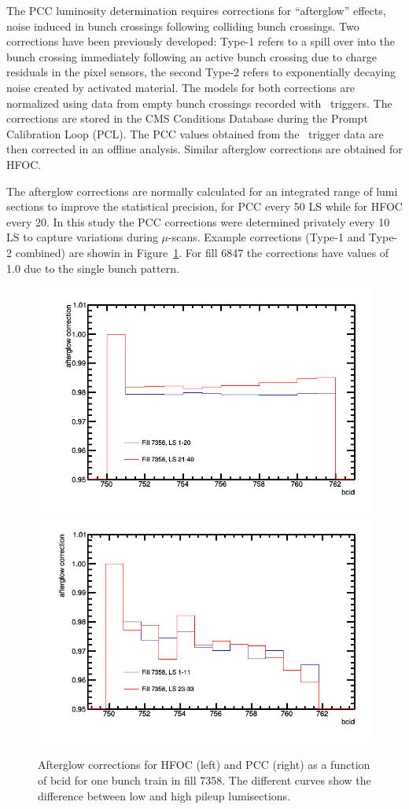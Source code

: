 
The PCC luminosity determination requires corrections for ``afterglow'' effects, noise induced in bunch crossings following colliding bunch crossings.
Two corrections have been previously developed: Type-1 refers to a spill over into the bunch crossing immediately following an active bunch crossing due to charge residuals in the pixel sensors, the second Type-2 refers to exponentially decaying noise created by activated material.
The models for both corrections are normalized using data from empty bunch crossings recorded with \random\ triggers.
The corrections are stored in the CMS Conditions Database during the Prompt Calibration Loop (PCL).
The PCC values obtained from the \zerobias\ trigger data are then corrected in an offline analysis.
Similar afterglow corrections are obtained for HFOC.

The afterglow corrections are normally calculated for an integrated range of lumi sections to improve the statistical precision, for PCC every 50 LS while for HFOC every 20. In this study the PCC corrections were determined privately every 10 LS to capture variations during $\mu$-scans.
Example corrections (Type-1 and Type-2 combined) are showin in Figure~\ref{fig:afterglow}.
For fill 6847 the corrections have values of 1.0 due to the single bunch pattern.

\begin{figure}[t]
  \begin{center}
    \includegraphics[width=0.47\linewidth]{plots/HFAfterglowCorr.png}
    \includegraphics[width=0.47\linewidth]{plots/PCCAfterglowCorr.png}
    \caption{
      Afterglow corrections for HFOC (left) and PCC (right) as a function of bcid for one bunch train in fill 7358.
      The different curves show the difference between low and high pileup lumisections.
    \label{fig:afterglow}
    }
  \end{center}
\end{figure}

